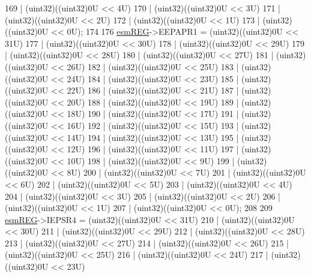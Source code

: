 \begin{DoxyCode}
169                   | (uint32)((uint32)0U <<  4U)
170                   | (uint32)((uint32)0U <<  3U)
171                   | (uint32)((uint32)0U <<  2U)
172                   | (uint32)((uint32)0U <<  1U)
173                   | (uint32)((uint32)0U <<  0U);
174 
176     \mbox{\hyperlink{reg__esm_8h_a7c2e779f2973e0c2c9496a4796df10f1}{esmREG}}->EEPAPR1 = (uint32)((uint32)0U << 31U)
177                     | (uint32)((uint32)0U << 30U)
178                     | (uint32)((uint32)0U << 29U)
179                     | (uint32)((uint32)0U << 28U)
180                     | (uint32)((uint32)0U << 27U)
181                     | (uint32)((uint32)0U << 26U)
182                     | (uint32)((uint32)0U << 25U)
183                     | (uint32)((uint32)0U << 24U)
184                     | (uint32)((uint32)0U << 23U)
185                     | (uint32)((uint32)0U << 22U)
186                     | (uint32)((uint32)0U << 21U)
187                     | (uint32)((uint32)0U << 20U)
188                     | (uint32)((uint32)0U << 19U)
189                     | (uint32)((uint32)0U << 18U)
190                     | (uint32)((uint32)0U << 17U)
191                     | (uint32)((uint32)0U << 16U)
192                     | (uint32)((uint32)0U << 15U)
193                     | (uint32)((uint32)0U << 14U)
194                     | (uint32)((uint32)0U << 13U)
195                     | (uint32)((uint32)0U << 12U)
196                     | (uint32)((uint32)0U << 11U)
197                     | (uint32)((uint32)0U << 10U)
198                     | (uint32)((uint32)0U <<  9U)
199                     | (uint32)((uint32)0U <<  8U)
200                     | (uint32)((uint32)0U <<  7U)
201                     | (uint32)((uint32)0U <<  6U)
202                     | (uint32)((uint32)0U <<  5U)
203                     | (uint32)((uint32)0U <<  4U)
204                     | (uint32)((uint32)0U <<  3U)
205                     | (uint32)((uint32)0U <<  2U)
206                     | (uint32)((uint32)0U <<  1U)
207                     | (uint32)((uint32)0U <<  0U);
208 
209     \mbox{\hyperlink{reg__esm_8h_a7c2e779f2973e0c2c9496a4796df10f1}{esmREG}}->IEPSR4 = (uint32)((uint32)0U << 31U)
210                    | (uint32)((uint32)0U << 30U)
211                    | (uint32)((uint32)0U << 29U)
212                    | (uint32)((uint32)0U << 28U)
213                    | (uint32)((uint32)0U << 27U)
214                    | (uint32)((uint32)0U << 26U)
215                    | (uint32)((uint32)0U << 25U)
216                    | (uint32)((uint32)0U << 24U)
217                    | (uint32)((uint32)0U << 23U)

\end{DoxyCode}
